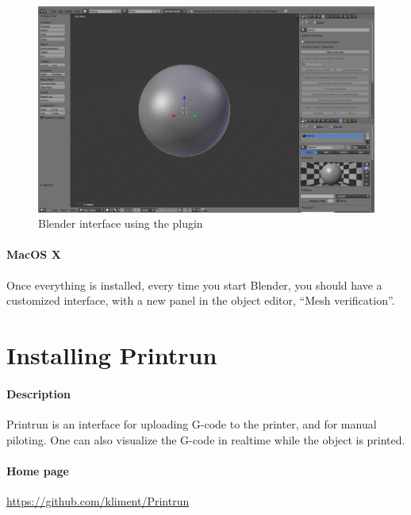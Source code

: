 \documentclass{article}
\begin{document}

	\begin{figure}[h!]
		\centering
		\includegraphics[width=\linewidth]{blender-plugin.png}
		\caption{Blender interface using the plugin}
	\end{figure}

	\paragraph{MacOS X} %

	Once everything is installed, every time you start Blender, you should have a customized interface, with a new panel in the object editor, “Mesh verification”.

\newpage

\section{Installing Printrun}

	\paragraph{Description} Printrun is an interface for uploading G-code to the printer, and for manual piloting. One can also visualize the G-code in realtime while the object is printed.

	\paragraph{Home page} \url{https://github.com/kliment/Printrun}
\end{document}
